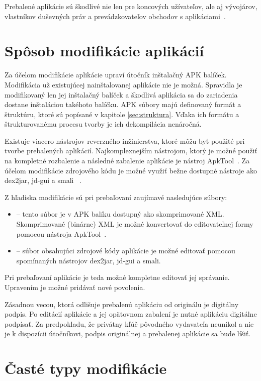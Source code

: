 Prebalené aplikácie sú škodlivé nie len pre koncových užívateľov, ale aj vývojárov, vlastníkov duševných práv a prevádzkovateľov obchodov s aplikáciami~\cite{CloneRelative}. 

\section{Spôsob modifikácie aplikácií}
Za účelom modifikácie aplikácie upraví útočník inštalačný APK balíček. Modifikácia už existujúcej nainštalovanej aplikácie nie je možná. Spravidla je modifikovaný len jej inštalačný balíček a škodlivá aplikácia sa do zariadenia dostane inštaláciou takéhoto balíčku.
APK súbory majú definovaný formát a štruktúru, ktoré sú popísané v kapitole \ref{sec:struktura}. Vďaka ich formátu a štrukturovanému procesu tvorby je ich dekompilácia nenáročná.

Existuje viacero nástrojov reverzného inžinierstva, ktoré môžu byť použité pri tvorbe prebalených aplikácií. Najkomplexnejším nástrojom, ktorý je možné použiť na kompletné rozbalenie a následné zabalenie aplikácie je nástroj ApkTool~\cite{Apktool}. Za účelom modifikácie zdrojového kódu je možné využiť bežne dostupné nástroje ako dex2jar, jd-gui a smali ~\cite{Dex2jar, jdgui, smali}.

Z hľadiska modifikácie sú pri prebaľovaní zaujímavé nasledujúce súbory:

\begin{itemize}
	\item {} -- tento súbor je v APK balíku dostupný ako skomprimované XML. Skomprimované (binárne) XML je možné konvertovať do editovateľnej formy pomocou nástroja ApkTool~\cite{Apktool}.
	\item {} -- súbor obsahujúci zdrojové kódy aplikácie je možné editovať pomocou spomínaných nástrojov dex2jar, jd-gui a smali.
\end{itemize}

Pri prebaľovaní aplikácie je teda možné kompletne editovať jej správanie. Upravením  je možné pridávať nové povolenia. 

Zásadnou vecou, ktorá odlišuje prebalenú aplikáciu od originálu je digitálny podpis. Po editácií aplikácie a jej opätovnom zabalení je nutné aplikáciu digitálne podpísať. Za predpokladu, že privátny kľúč pôvodného vydavateľa neunikol a nie je k dispozícii útočníkovi, podpis originálnej a prebalenej aplikácie sa bude líšiť. 

\section{Časté typy modifikácie}

